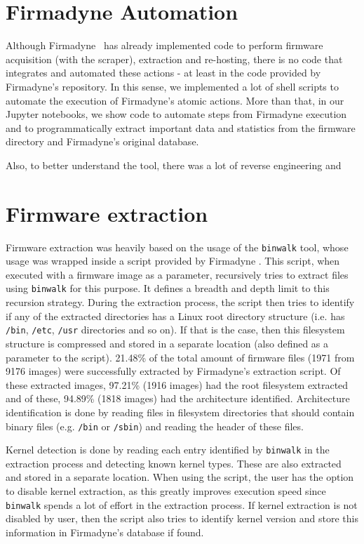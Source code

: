 \section{Firmadyne Automation}

Although Firmadyne~\cite{firmadyne} has already implemented code to perform firmware acquisition (with the scraper), extraction and re-hosting, there is no code that integrates and automated these actions - at least in the code provided by Firmadyne's repository. In this sense, we implemented a lot of shell scripts to automate the execution of Firmadyne's atomic actions. More than that, in our Jupyter notebooks, we show code to automate steps from Firmadyne execution and to programmatically extract important data and statistics from the firmware directory and Firmadyne's original database.

Also, to better understand the tool, there was a lot of reverse engineering and 

\section{Firmware extraction}
\label{sec:firmware-extraction}

Firmware extraction was heavily based on the usage of the {\tt binwalk} tool, whose usage was wrapped inside a script provided by Firmadyne \cite{firmadyne}. This script, when executed with a firmware image as a parameter, recursively tries to extract files using {\tt binwalk} for this purpose. It defines a breadth and depth limit to this recursion strategy. During the extraction process, the script then tries to identify if any of the extracted directories has a Linux root directory structure (i.e. has {\tt /bin}, {\tt /etc}, {\tt /usr} directories and so on). If that is the case, then this filesystem structure is compressed and stored in a separate location (also defined as a parameter to the script). 21.48\% of the total amount of firmware files (1971 from 9176 images) were successfully extracted by Firmadyne's \cite{firmadyne} extraction script. Of these extracted images, 97.21\% (1916 images) had the root filesystem extracted and of these, 94.89\% (1818 images) had the architecture identified. Architecture identification is done by reading files in filesystem directories that should contain binary files (e.g. {\tt /bin} or {\tt /sbin}) and reading the header of these files.

Kernel detection is done by reading each entry identified by {\tt binwalk} in the extraction process and detecting known kernel types. These are also extracted and stored in a separate location. When using the script, the user has the option to disable kernel extraction, as this greatly improves execution speed since {\tt binwalk} spends a lot of effort in the extraction process. If kernel extraction is not disabled by user, then the script also tries to identify kernel version and store this information in Firmadyne's \cite{firmadyne} database if found.

